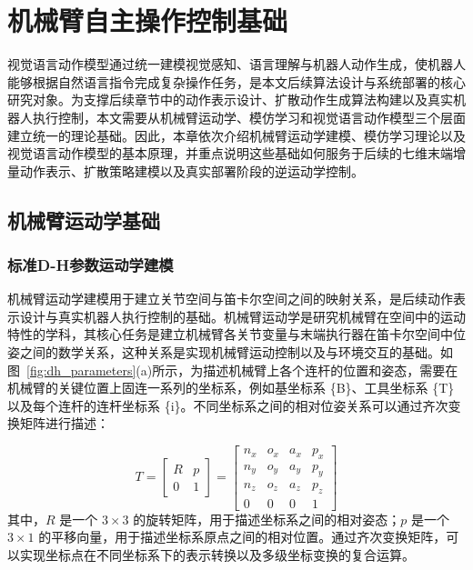 \chapter{机械臂自主操作控制基础}
\label{chp:foundations}

视觉语言动作模型通过统一建模视觉感知、语言理解与机器人动作生成，使机器人能够根据自然语言指令完成复杂操作任务，是本文后续算法设计与系统部署的核心研究对象。为支撑后续章节中的动作表示设计、扩散动作生成算法构建以及真实机器人执行控制，本文需要从机械臂运动学、模仿学习和视觉语言动作模型三个层面建立统一的理论基础。因此，本章依次介绍机械臂运动学建模、模仿学习理论以及视觉语言动作模型的基本原理，并重点说明这些基础如何服务于后续的七维末端增量动作表示、扩散策略建模以及真实部署阶段的逆运动学控制。

\section{机械臂运动学基础}
\label{sec:kinematics}
\subsection{标准D-H参数运动学建模}
\label{subsec:dh_modeling}

机械臂运动学建模用于建立关节空间与笛卡尔空间之间的映射关系，是后续动作表示设计与真实机器人执行控制的基础。机械臂运动学是研究机械臂在空间中的运动特性的学科，其核心任务是建立机械臂各关节变量与末端执行器在笛卡尔空间中位姿之间的数学关系，这种关系是实现机械臂运动控制以及与环境交互的基础。如图~\ref{fig:dh_parameters}(a)所示，为描述机械臂上各个连杆的位置和姿态，需要在机械臂的关键位置上固连一系列的坐标系，例如基坐标系 \{B\}、工具坐标系 \{T\} 以及每个连杆的连杆坐标系 \{i\}。不同坐标系之间的相对位姿关系可以通过齐次变换矩阵进行描述：

\begin{equation}
  \label{eq:homogeneous_transform}
  T = \begin{bmatrix}
    R & p \\
    0 & 1
  \end{bmatrix} = \begin{bmatrix}
    n_x & o_x & a_x & p_x \\
    n_y & o_y & a_y & p_y \\
    n_z & o_z & a_z & p_z \\
    0 & 0 & 0 & 1
  \end{bmatrix}
\end{equation}
其中，$R$ 是一个 $3 \times 3$ 的旋转矩阵，用于描述坐标系之间的相对姿态；$p$ 是一个 $3 \times 1$ 的平移向量，用于描述坐标系原点之间的相对位置。通过齐次变换矩阵，可以实现坐标点在不同坐标系下的表示转换以及多级坐标变换的复合运算。

